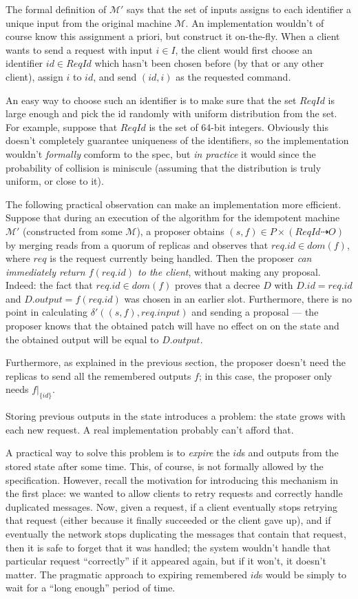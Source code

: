 \documentclass[12pt,a4paper,en]{pracamgr}
\newcommand{\ti}[1]{\textit{#1}}
\newcommand{\mc}[1]{\mathcal{#1}}
\newcommand{\res}[2]{\left.#1\right|_{#2}}
\begin{document}
The formal definition of $\mc M'$ says that the set of inputs assigns to each identifier a unique input from the original machine $\mc M$. An implementation wouldn't of course know this assignment a priori, but construct it on-the-fly. When a client wants to send a request with input $i \in I$, the client would first choose an identifier $id \in ReqId$ which hasn't been chosen before (by that or any other client), assign $i$ to $id$, and send $(id, i)$ as the requested command.

An easy way to choose such an identifier is to make sure that the set $ReqId$ is large enough and pick the id randomly with uniform distribution from the set. For example, suppose that $ReqId$ is the set of 64-bit integers. Obviously this doesn't completely guarantee uniqueness of the identifiers, so the implementation wouldn't \ti{formally} comform to the spec, but \ti{in practice} it would since the probability of collision is miniscule (assuming that the distribution is truly uniform, or close to it).

The following practical observation can make an implementation more efficient. Suppose that during an execution of the algorithm for the idempotent machine $\mc M'$ (constructed from some $\mc M$), a proposer obtains $(s, f) \in P \times (ReqId \dashrightarrow O)$ by merging reads from a quorum of replicas and observes that $req.id \in dom(f)$, where $req$ is the request currently being handled. Then the proposer \ti{can immediately return $f(req.id)$ to the client}, without making any proposal. Indeed: the fact that $req.id \in dom(f)$ proves that a decree $D$ with $D.id = req.id$ and $D.output = f(req.id)$ was chosen in an earlier slot. Furthermore, there is no point in calculating $\delta'((s, f), req.input)$ and sending a proposal --- the proposer knows that the obtained patch will have no effect on on the state and the obtained output will be equal to $D.output$.

Furthermore, as explained in the previous section, the proposer doesn't need the replicas to send all the remembered outputs $f$; in this case, the proposer only needs $\res{f}{\{id\}}$.

Storing previous outputs in the state introduces a problem: the state grows with each new request. A real implementation probably can't afford that.

A practical way to solve this problem is to \ti{expire} the $id$s and outputs from the stored state after some time. This, of course, is not formally allowed by the specification. However, recall the motivation for introducing this mechanism in the first place: we wanted to allow clients to retry requests and correctly handle duplicated messages. Now, given a request, if a client eventually stops retrying that request (either because it finally succeeded or the client gave up), and if eventually the network stops duplicating the messages that contain that request, then it is safe to forget that it was handled; the system wouldn't handle that particular request ``correctly'' if it appeared again, but if it won't, it doesn't matter. The pragmatic approach to expiring remembered $id$s would be simply to wait for a ``long enough'' period of time.
\end{document}

